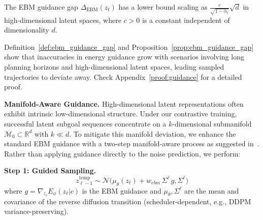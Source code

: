\documentclass{article} %
\begin{document}
\begin{proposition}
\label{prop:ebm_guidance_gap}
 The EBM guidance gap $\Delta_{\text{EBM}}(z_t)$ has a lower bound scaling as $\frac{c}{\sqrt{1-\bar{\alpha}_t}}\sqrt{d}$ in high-dimensional latent spaces, where $c > 0$ is a constant independent of dimensionality $d$.
\end{proposition}

Definition~\ref{def:ebm_guidance_gap} and Proposition~\ref{prop:ebm_guidance_gap} show that inaccuracies in energy guidance grow with scenarios involving long planning horizons and high-dimensional latent spaces, leading sampled trajectories to deviate away. Check Appendix~\ref{proof:guidance} for a detailed proof.


\textbf{Manifold-Aware Guidance.} High-dimensional latent representations often exhibit intrinsic low-dimensional structure. Under our contrastive training, successful latent subgoal sequences concentrate on a $k$-dimensional submanifold $\mathcal{M}_0 \subset \mathbb{R}^d$ with $k \ll d$. To mitigate this manifold deviation, we enhance the standard EBM guidance with a two-step manifold-aware process as suggested in~\citep{lee2025local}. Rather than applying guidance directly to the noise prediction, we perform:

\textbf{Step 1: Guided Sampling.}
\begin{equation}
    z_{\ell-1}^{\text{temp}} \sim \mathcal{N}\big(\mu_\theta(z_\ell) + w_{ebm}\, \Sigma^\ell \, g, 
    \Sigma^\ell\big)
\end{equation}
where $g = \nabla_{z_\ell} E_\phi(z_\ell|c)$ is the EBM guidance and $\mu_\theta, \Sigma^\ell$ are the mean and covariance of the reverse diffusion transition (scheduler-dependent, e.g., DDPM variance-preserving).
\end{document}
